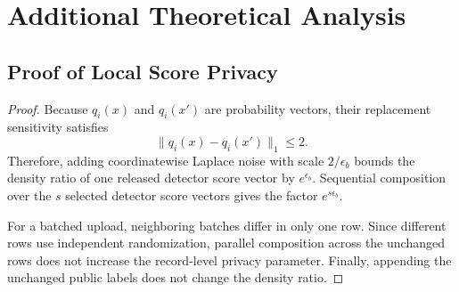 \documentclass[conference]{IEEEtran}
\theoremstyle{definition}
\begin{document}


\ifCLASSOPTIONcaptionsoff
  \newpage
\fi




\appendices
\section{Additional Theoretical Analysis}
\label{app:theory}

\subsection{Proof of Local Score Privacy}
\label{app:proof_privacy}
\begin{proof}
Because $q_i(x)$ and $q_i(x')$ are probability vectors, their replacement sensitivity satisfies
\begin{equation}
\|q_i(x)-q_i(x')\|_1\le2.
\end{equation}
Therefore, adding coordinatewise Laplace noise with scale $2/\epsilon_b$ bounds the density ratio of one released detector score vector by $e^{\epsilon_b}$.
Sequential composition over the $s$ selected detector score vectors gives the factor $e^{s\epsilon_b}$.

For a batched upload, neighboring batches differ in only one row.
Since different rows use independent randomization, parallel composition across the unchanged rows does not increase the record-level privacy parameter.
Finally, appending the unchanged public labels does not change the density ratio.
\end{proof}
\end{document}
